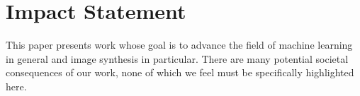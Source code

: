 \vspace{-0.1cm}
\section*{Impact Statement}
\vspace{-0.1cm}
This paper presents work whose goal is to advance the field
of machine learning in general and image synthesis in particular. There are many potential societal consequences
of our work, none of which we feel must be specifically
highlighted here.